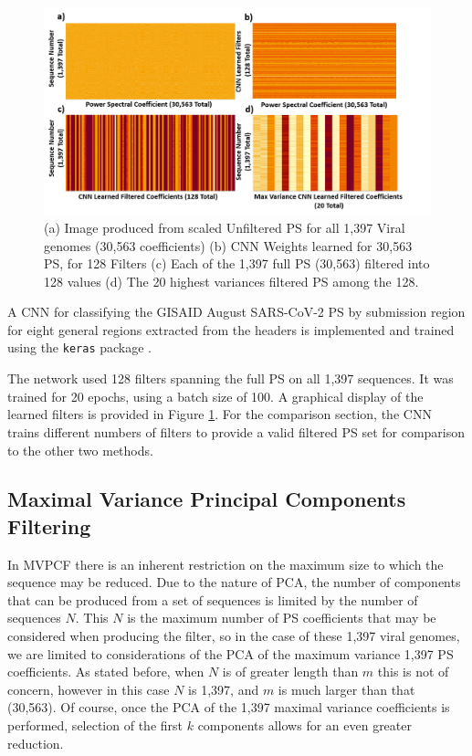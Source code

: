\documentclass[10pt,conference]{IEEEtran}
\begin{document}
\begin{figure}[h!]
\centering
\includegraphics[scale=0.34]{Images/Files/CNNFilters.png}
\caption{(a) Image produced from scaled Unfiltered PS for all 1,397 Viral genomes (30,563 coefficients) (b) CNN Weights learned for 30,563 PS, for 128 Filters (c) Each of the 1,397 full PS (30,563) filtered into 128 values (d) The 20 highest variances filtered PS among the 128.  \label{fig:CNN128Filts}}
\end{figure}

A CNN for classifying the GISAID August SARS-CoV-2 PS by submission region for eight general regions extracted from the headers is implemented and trained using the \texttt{keras} package \cite{kerR21}.

The network used 128 filters spanning the full PS on all 1,397 sequences. 
It was trained for 20 epochs, using a batch size of 100.  
A graphical display of the learned filters is provided in Figure \ref{fig:CNN128Filts}.
For the comparison section, the CNN trains different numbers of filters to provide a 
valid filtered PS set for comparison to the other two methods. 
\subsection{Maximal Variance Principal Components Filtering}

\noindent In MVPCF there is an inherent 
restriction on the maximum size to which the sequence may be reduced.
Due to the nature of PCA, the number of components that can be produced from a set of sequences is limited by the number of sequences $N$.  
This $N$ is the maximum number of PS coefficients that may be considered when 
producing the filter, so in the case of these 1,397 viral genomes, we are limited to 
considerations of the PCA of the maximum variance 1,397 PS coefficients. 
As stated before, when $N$ is of greater length than $m$ this is not of concern, 
however in this case $N$ is 1,397, and $m$ is much larger than that (30,563). 
Of course, once the PCA of the 1,397 maximal variance coefficients is performed, 
selection of the first $k$ components allows for an even greater reduction.
\end{document}
